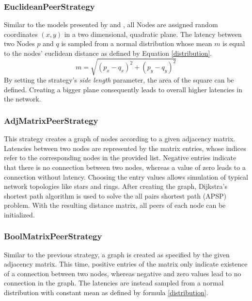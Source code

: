 \documentclass[a4paper,12pt,twoside]{report}
\begin{document}
\subsubsection{EuclideanPeerStrategy}
Similar to the models presented by \cite{mwalemodel} and \cite{selfishmine2}, all Nodes are assigned random coordinates $(x,y)$ in a two dimensional, quadratic plane. The latency between two Nodes $p$ and $q$ is sampled from a normal distribution whose mean $m$ is equal to the nodes' euclidean distance as defined by Equation \ref{distribution}.
\begin{equation}\label{euclid}
m = \sqrt{(p_{x}-q_{x})^{2}+(p_{y}-q_{y})^{2}}
\end{equation}
By setting the strategy's \textit{side length} parameter, the area of the square can be defined. Creating a bigger plane consequently leads to overall higher latencies in the network.
\subsubsection{AdjMatrixPeerStrategy}
This strategy creates a graph of nodes according to a given adjacency matrix. Latencies between two nodes are represented by the matrix entries, whose indices refer to the corresponding nodes in the provided list. Negative entries indicate that there is no connection between two nodes, whereas a value of zero leads to a connection without latency. Choosing the entry values allows simulation of typical network topologies like stars and rings. After creating the graph, Dijkstra's shortest path algorithm is used to solve the all pairs shortest path (APSP) problem. With the resulting distance matrix, all peers of each node can be initialized.
\subsubsection{BoolMatrixPeerStrategy}
Similar to the previous strategy, a graph is created as specified by the given adjacency matrix. This time, positive entries of the matrix only indicate existence of a connection between two nodes, whereas negative and zero values lead to no connection in the graph. The latencies are instead sampled from a normal distribution with constant mean as defined by formula \ref{distribution}.
\end{document}
